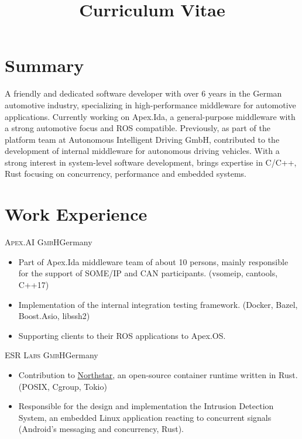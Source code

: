 \documentclass[10pt]{moderncv}
\title{Curriculum Vitae}
\begin{document}
\maketitle

\section{Summary}

A friendly and dedicated software developer with over 6 years in the German automotive industry, specializing in
high-performance middleware for automotive applications. Currently working on Apex.Ida, a general-purpose middleware with a
strong automotive focus and ROS compatible. Previously, as part of the platform team at Autonomous Intelligent Driving GmbH,
contributed to the development of internal middleware for autonomous driving vehicles. With a strong interest in system-level
software development, brings expertise in C/C++, Rust focusing on concurrency, performance and embedded systems.

\section{Work Experience}

{\textsc{Apex.AI GmbH}}{Germany}{}{%
\begin{itemize}
    \item Part of Apex.Ida middleware team of about 10 persons, mainly responsible for the support of SOME/IP and CAN
        participants. (vsomeip, cantools, C++17)
    \item Implementation of the internal integration testing framework. (Docker, Bazel, Boost.Asio, libssh2)
    \item Supporting clients to their ROS applications to Apex.OS.
\end{itemize}
}

{\textsc{ESR Labs GmbH}}{Germany}{}{%
\begin{itemize}
    \item Contribution to \href{https://github.com/esrlabs/northstar}{Northstar}, an open-source container runtime written in
        Rust. (POSIX, Cgroup, Tokio)
    \item Responsible for the design and implementation the Intrusion Detection System, an embedded Linux application reacting
        to concurrent signals (Android's messaging and concurrency, Rust).
\end{itemize}
}
\end{document}

